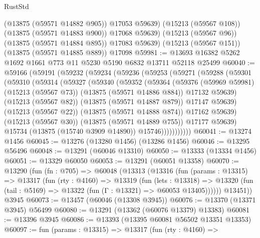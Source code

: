 \begin{lexlean}{RustStd}
\begin{coremodule}
          (@13875 (@59571 @14882 @905))
          @17053
          @59639)
        (@15213 (@59567 @108))
        (@13875 (@59571 @14883 @900))
        @17068
        @59639)
      (@15213 (@59567 @96))
      (@13875 (@59571 @14884 @895))
      @17083
      @59639)
    (@15213 (@59567 @151))
    (@13875 (@59571 @14885 @889))
    @17098
@59981 := @13693 @16382 @5262 @1692 @1661 @773 @11 @5230 @5190 @6832 @13711 @52118 @25499
@60040 := @59166
    (@59191
      (@59232
        (@59234
          (@59236
            (@59253
              (@59271
                (@59288
                  (@59301
                    (@59310
                      (@59314
                        (@59327
                          (@59340
                            (@59352
                              (@59364
                                (@59376
                                  (@59969 @59981)
                                  (@15213 (@59567 @73))
                                  (@13875 (@59571 @14886 @884))
                                  @17132
                                  @59639)
                                (@15213 (@59567 @82))
                                (@13875 (@59571 @14887 @879))
                                @17147
                                @59639)
                              (@15213 (@59567 @22))
                              (@13875 (@59571 @14888 @874))
                              @17162
                              @59639)
                            (@15213 (@59567 @30))
                            (@13875 (@59571 @14889 @755))
                            @17177
                            @59639)
                          @15734
                          (@13875 (@15740 @3909 @14890))
                          @15746)))))))))))
@60041 := @13274 @1456
@60045 := @13276 (@13280 @1456) (@13286 @1456)
@60046 := @13295 @56496
@60048 := @13291 (@60046 @13310)
@60050 := @13333 (@13334 @1456)
@60051 := @13329 @60050
@60053 := @13291 (@60051 @13358)
@60070 := @13290
    (fun (fn : @705) =>
    @60048
      (@13313
        (@13316
          (fun (params : @13315) =>
          @13317
            (fun (rty : @4160) =>
            @13319
              (fun (lets : @13318) =>
              @13320 (fun (tail : @5169) => @13322 (fun (Γ : @13321) => @60053 @13405))))))
        @13451))
    @3945
@60073 := @13457 (@60046 (@13308 @3945))
@60076 := @13370 (@13371 @3945) @56499
@60080 := @13291 (@13362 (@60076 @13379) @13383)
@60081 := @13396 @3945
@60086 := @13393 (@13395 @60081 @56502 @13351 @13353)
@60097 := fun (params : @13315) =>
  @13317
    (fun (rty : @4160) =>

\end{coremodule}
\end{lexlean}
